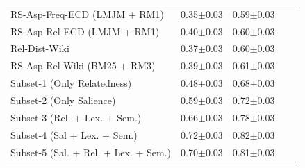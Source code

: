 \begin{table}[t]
\begin{tabular}{@{}lllll@{}}
     
      RS-Asp-Freq-ECD (LMJM + RM1)  &     
      0.35$\pm$0.03 &
      0.59$\pm$0.03
      \\
      
       
      RS-Asp-Rel-ECD (LMJM + RM1) &     
      0.40$\pm$0.03 &
      0.60$\pm$0.03
      \\
       \midrule
      
      
      Rel-Dist-Wiki  &    
      0.37$\pm$0.03 &
      0.60$\pm$0.03
      \\
      
      
       
      RS-Asp-Rel-Wiki (BM25 + RM3)  &     
      0.39$\pm$0.03 &
      0.61$\pm$0.03
      \\
      \midrule
      
       Subset-1 (Only Relatedness) &
      0.48$\pm$0.03 &
      0.68$\pm$0.03
      \\
      
      
      Subset-2 (Only Salience) &
      0.59$\pm$0.03 &
      0.72$\pm$0.03
      \\
      
       Subset-3 (Rel. + Lex. + Sem.) &
      0.66$\pm$0.03 &
      0.78$\pm$0.03
      \\
      
       Subset-4 (Sal + Lex. + Sem.) &
      
      0.72$\pm$0.03 &
      0.82$\pm$0.03
      \\
      
      
      Subset-5 (Sal. + Rel. + Lex. + Sem.) &
      0.70$\pm$0.03 &
      0.81$\pm$0.03
      \\
     
      
      

     
      
       \bottomrule
    \end{tabular}
\end{table}






 

%


  